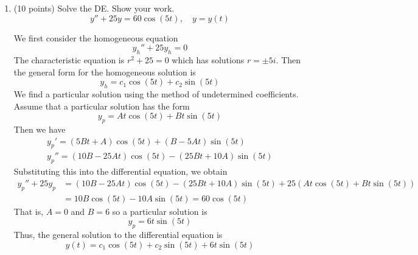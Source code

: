 \documentclass[11pt, titlepage]{article}
\begin{document}
\begin{enumerate}
        \pagebreak

        \item (10 points) Solve the DE. Show your work.
            \[
                y'' + 25y = 60 \cos(5t), \quad y = y(t)
            \] 

            \begin{solution}
                We first consider the homogeneous equation
                \[
                y_h'' + 25y_h = 0
                \] 
                The characteristic equation is $r^2 + 25 = 0$ which has
                solutions $r = \pm 5i$. Then the general form for the
                homogeneous solution is
                \[
                    y_h = c_1 \cos(5t) + c_2 \sin(5t)
                \] 
                We find a particular solution using the method of undetermined
                coefficients. Assume that a particular solution has the form
                \[
                    y_p = At \cos(5t) + Bt \sin(5t)
                \] 
                Then we have
                \begin{gather*}
                    y_p' = (5Bt + A) \cos(5t) + (B - 5At) \sin(5t) \\
                    y_p'' = (10B - 25At) \cos(5t) - (25Bt + 10A) \sin(5t)
                \end{gather*}
                Substituting this into the differential equation, we obtain
                \begin{align*}
                    y_p'' + 25y_p &= (10B - 25At) \cos(5t) - (25Bt + 10A)
                    \sin(5t) + 25(At \cos(5t) + Bt \sin(5t)) \\
                                  &= 10B \cos(5t) - 10A \sin(5t) = 60 \cos(5t)
                \end{align*}
                That is, $A = 0$ and $B = 6$ so a particular solution is
                \[
                    y_p = 6t \sin(5t)
                \] 
                Thus, the general solution to the differential equation is
                \[
                    y(t) = c_1 \cos(5t) + c_2 \sin(5t) + 6t \sin(5t)
                \] 
            \end{solution}
        \pagebreak


\end{enumerate}
\end{document}
